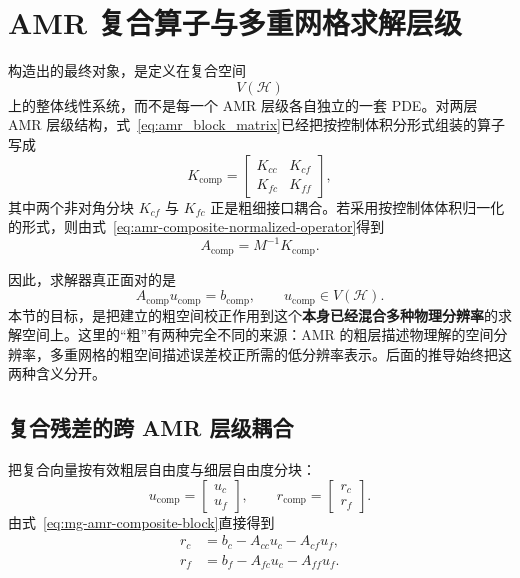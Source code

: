 \section{AMR 复合算子与多重网格求解层级}
\label{sec:amr-vs-mg-level}

构造出的最终对象，是定义在复合空间
\begin{equation}
V(\mathcal H)
\end{equation}
上的整体线性系统，而不是每一个 AMR 层级各自独立的一套 PDE。对两层 AMR 层级结构，式~\eqref{eq:amr_block_matrix}已经把按控制体积分形式组装的算子写成
\begin{equation}
K_{\mathrm{comp}}
=
\begin{bmatrix}
K_{cc}&K_{cf}\\
K_{fc}&K_{ff}
\end{bmatrix},
\label{eq:mg-amr-composite-block}
\end{equation}
其中两个非对角分块 $K_{cf}$ 与 $K_{fc}$ 正是粗细接口耦合。若采用按控制体体积归一化的形式，则由式~\eqref{eq:amr-composite-normalized-operator}得到
\begin{equation}
A_{\mathrm{comp}}=M^{-1}K_{\mathrm{comp}}.
\end{equation}

因此，求解器真正面对的是
\begin{equation}
A_{\mathrm{comp}}u_{\mathrm{comp}}=b_{\mathrm{comp}},
\qquad
u_{\mathrm{comp}}\in V(\mathcal H).
\label{eq:mg-amr-composite-linear-system}
\end{equation}
本节的目标，是把建立的粗空间校正作用到这个\textbf{本身已经混合多种物理分辨率}的求解空间上。这里的“粗”有两种完全不同的来源：AMR 的粗层描述物理解的空间分辨率，多重网格的粗空间描述误差校正所需的低分辨率表示。后面的推导始终把这两种含义分开。

\subsection{复合残差的跨 AMR 层级耦合}

把复合向量按有效粗层自由度与细层自由度分块：
\begin{equation}
u_{\mathrm{comp}}
=
\begin{bmatrix}u_c\\u_f\end{bmatrix},
\qquad
r_{\mathrm{comp}}
=
\begin{bmatrix}r_c\\r_f\end{bmatrix}.
\end{equation}
由式~\eqref{eq:mg-amr-composite-block}直接得到
\begin{align}
r_c
&=b_c-A_{cc}u_c-A_{cf}u_f,\\
r_f
&=b_f-A_{fc}u_c-A_{ff}u_f.
\label{eq:mg-amr-block-residual}
\end{align}

